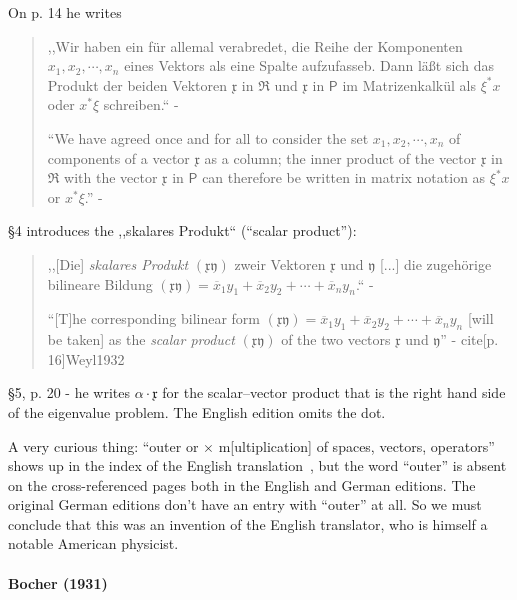 On p. 14 he writes
\begin{quote}
,,Wir haben ein für allemal verabredet, die Reihe der Komponenten $x_1, x_2, \cdots, x_n$
eines Vektors als eine Spalte aufzufasseb. Dann läßt sich das Produkt der beiden
Vektoren $\mathfrak x$ in $\mathfrak R$ und $\mathfrak x$ in $\mathsf P$
im Matrizenkalkül als $\xi^* x$ oder $x^* \xi$ schreiben.`` - \cite[p. 14]{Weyl1928}

``We have agreed once and for all to consider the set
$x_1, x_2, \cdots, x_n$ of components of a vector $\mathfrak x$ as a column; the
inner product of the vector $\mathfrak x$ in $\mathfrak R$ with the vector $\mathfrak x$
in $\mathsf P$ can therefore be written in matrix notation as $\xi^* x$ or $x^* \xi$.''
- \cite[p. 14]{Weyl1931}
\end{quote}

\S 4 introduces the ,,skalares Produkt`` (``scalar product''):
\begin{quote}
,,[Die] \textit{skalares Produkt} $(\mathfrak x \mathfrak y)$ zweir Vektoren
$\mathfrak x$ und $\mathfrak y$ [...] die zugehörige bilineare Bildung
$(\mathfrak x \mathfrak y) = \overline x_1 y_1 + \overline x_2 y_2 + \cdots + \overline x_n y_n $.``
- \cite[p. 15]{Weyl1928}

``[T]he corresponding bilinear form
$(\mathfrak x \mathfrak y) = \overline x_1 y_1 + \overline x_2 y_2 + \cdots + \overline x_n y_n $
[will be taken] as the \textit{scalar product} $(\mathfrak x \mathfrak y)$ of the two vectors
$\mathfrak x$ und $\mathfrak y$'' - cite[p. 16]{Weyl1932}
\end{quote}

\S 5, p. 20 - he writes $\alpha \cdot \mathfrak x$ for the scalar--vector product
that is the right hand side of the eigenvalue problem. The English edition omits the dot.

A very curious thing: ``outer or $\times$ m[ultiplication] of spaces, vectors,
operators'' shows up in the index of the English translation~\cite{Weyl1931},
but the word ``outer'' is absent on the cross-referenced pages both in the
English and German editions. The original German editions don't have an entry
with ``outer'' at all. So we must conclude that this was an invention of the
English translator, who is himself a notable American physicist.



\paragraph{Bocher (1931)}

